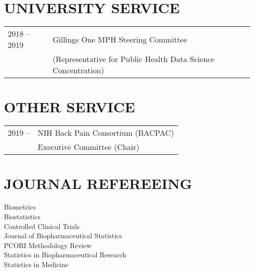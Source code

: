 \documentclass[11pt]{article}
\begin{document}
\section*{\large \bf UNIVERSITY SERVICE}
\begin{tabular}[!h]{p{3cm}p{14cm}}
2018 -- 2019 & Gillings One MPH Steering Committee \\
          & (Representative for Public Health Data Science Concentration)
\end{tabular}

\section*{\large \bf OTHER SERVICE}
\begin{tabular}[!h]{p{3cm}p{14cm}}
2019 -- & NIH Back Pain Consortium (BACPAC) \\
        & Executive Committee (Chair)
\end{tabular}

\section*{\large \bf JOURNAL REFEREEING}
Biometrics \\
Biostatistics \\
Controlled Clinical Trials \\
Journal of Biopharmaceutical Statistics \\
PCORI Methodology Review \\
Statistics in Biopharmaceutical Research \\
Statistics in Medicine \\
\end{document}
